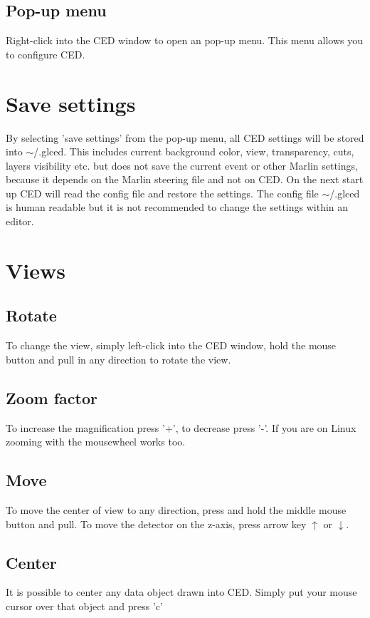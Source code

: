 \documentclass[a4paper,10pt]{article}
\begin{document}
\subsection{Pop-up menu}
Right-click into the CED window to open an pop-up menu. This menu allows you to configure CED.

\section{Save settings}
By selecting 'save settings' from the pop-up menu, all CED settings will be stored into $\sim$/.glced. This includes current background color, view, transparency, cuts, layers visibility etc. but does not save the current event or other Marlin settings, because it depends on the Marlin steering file and not on CED. On the next start up CED will read the config file and restore the settings.
\newline\newline
The config file $\sim$/.glced is human readable but it is not recommended to change the settings within an editor.

\section{Views}
\subsection{Rotate}
To change the view, simply left-click into the CED window, hold the mouse button and pull in any direction to rotate the view.
\subsection{Zoom factor}
To increase the magnification press '+', to decrease press '-'. If you are on Linux zooming with the mousewheel works too. 

\subsection{Move}
To move the center of view to any direction, press and hold the middle mouse button and pull. 
\newline\newline
To move the detector on the z-axis, press arrow key $\uparrow$ or $\downarrow$. 
\subsection{Center}
It is possible to center any data object drawn into CED. Simply put your mouse cursor over that object and press 'c' 
\end{document}
